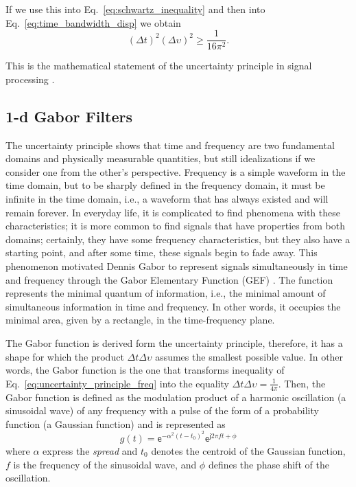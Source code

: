 If we use this into Eq.\ \eqref{eq:schwartz_inequality} and then into Eq.\ \eqref{eq:time_bandwidth_disp} we obtain
\begin{equation}\label{eq:uncertainty_principle_freq_square}
   (\Delta t)^2(\Delta \upsilon)^2 \geq \frac{1}{16\pi^{2}} \text{.}
\end{equation}

This is the mathematical statement of the uncertainty principle in signal processing \citep{Petrou.Sevilla:Book:2006}.

\subsection{1-d Gabor Filters}
The uncertainty principle shows that time and frequency are two fundamental domains and physically measurable quantities, but still idealizations if we consider one from the other's perspective. Frequency is a simple waveform in the time domain, but to be sharply defined in the frequency domain, it must be infinite in the time domain, i.e., a waveform that has always existed and will remain forever. In everyday life, it is complicated to find phenomena with these characteristics; it is more common to find signals that have properties from both domains; certainly, they have some frequency characteristics, but they also have a starting point, and after some time, these signals begin to fade away. This phenomenon motivated Dennis Gabor to represent signals simultaneously in time and frequency through the Gabor Elementary Function (GEF) \citep{Gabor:JIEE:1946}. The function represents the minimal quantum of information, i.e., the minimal amount of simultaneous information in time and frequency. In other words, it occupies the minimal area, given by a rectangle, in the time-frequency plane.  

The Gabor function is derived form the uncertainty principle, therefore, it has a shape for which the product $\Delta t \Delta \upsilon$ assumes the smallest possible value. In other words, the Gabor function is the one that transforms inequality of Eq.\ \eqref{eq:uncertainty_principle_freq} into the equality $\Delta t \Delta \upsilon = \frac{1}{4 \pi}$. Then, the Gabor function is defined as the modulation product of a harmonic oscillation (a sinusoidal wave) of any frequency with a pulse of the form of a probability function (a Gaussian function) \citep{Gabor:JIEE:1946} and is represented as
\begin{equation}\label{eq:gabor_function_1d_time}
    g(t) =  \mathsf{e}^{-\alpha^2(t-t_0)^2} \mathsf{e}^{\mathsf{j} 2 \pi f t + \phi}
\end{equation}
where $\alpha$ express the \textit{spread} and $t_0$ denotes the centroid of the Gaussian function, $f$ is the frequency of the sinusoidal wave, and $\phi$ defines the phase shift of the oscillation.

